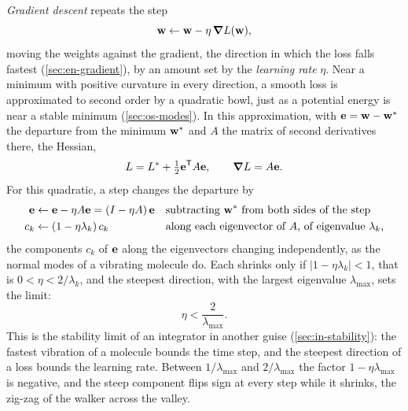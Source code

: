 \emph{Gradient descent} repeats the step
\begin{equation}
   \bm{\mathrm{w}} \leftarrow \bm{\mathrm{w}} - \eta\,\bm{\nabla} L(\bm{\mathrm{w}}) ,
   \label{eq:lo-descent}
\end{equation}
moving the weights against the gradient, the direction in which the loss
falls fastest (\cref{sec:en-gradient}), by an amount set by the
\emph{learning rate} $\eta$. Near a minimum with positive curvature in
every direction, a smooth loss is approximated to second order by a
quadratic bowl, just as a potential energy is near a stable minimum
(\cref{sec:os-modes}). In this approximation, with $\bm{\mathrm{e}} = \bm{\mathrm{w}} - \bm{\mathrm{w}}^\ast$ the
departure from the minimum $\bm{\mathrm{w}}^\ast$ and $A$ the matrix of second
derivatives there, the Hessian,
\begin{equation*}
   L = L^\ast + \tfrac12\bm{\mathrm{e}}^{\mathsf T}A\bm{\mathrm{e}} , \qquad
   \bm{\nabla} L = A\bm{\mathrm{e}} .
\end{equation*}
For this quadratic, a step changes the departure by
\begin{align*}
   \bm{\mathrm{e}} &\leftarrow \bm{\mathrm{e}} - \eta A\bm{\mathrm{e}} = (I - \eta A)\,\bm{\mathrm{e}}
      && \text{subtracting $\bm{\mathrm{w}}^\ast$ from both sides of the step}\\
   c_k &\leftarrow (1 - \eta\lambda_k)\,c_k
      && \text{along each eigenvector of $A$, of eigenvalue $\lambda_k$,}
\end{align*}
the components $c_k$ of $\bm{\mathrm{e}}$ along the eigenvectors changing
independently, as the normal modes of a vibrating molecule do. Each
shrinks only if $\lvert1 - \eta\lambda_k\rvert < 1$, that is $0 < \eta <
2/\lambda_k$, and the steepest direction, with the largest eigenvalue
$\lambda_{\max}$, sets the limit:
\begin{equation}
   \eta < \frac{2}{\lambda_{\max}} .
   \label{eq:lo-limit}
\end{equation}
This is the stability limit of an integrator in another guise
(\cref{sec:in-stability}): the fastest vibration of a molecule bounds the
time step, and the steepest direction of a loss bounds the learning rate.
Between $1/\lambda_{\max}$ and $2/\lambda_{\max}$ the factor $1 -
\eta\lambda_{\max}$ is negative, and the steep component flips sign at
every step while it shrinks, the zig-zag of the walker across the valley.

